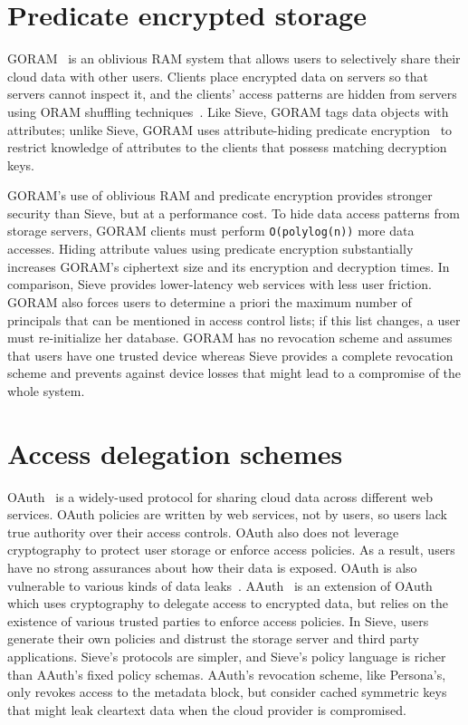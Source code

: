 \section{Predicate encrypted storage}
GORAM~\cite{GORAM} is an oblivious RAM system
that allows users to selectively share their
cloud data with other users. Clients place
encrypted data on servers so that servers cannot
inspect it, and the clients' access patterns are
hidden from servers using ORAM shuffling
techniques~\cite{shroud}. Like Sieve, GORAM tags
data objects with attributes; unlike Sieve,
GORAM uses attribute-hiding predicate encryption~\cite{katz2008,shen2009}
to restrict knowledge of attributes to the
clients that possess matching decryption keys.

GORAM's use of oblivious RAM and predicate
encryption provides stronger security than Sieve,
but at a performance cost. To hide
data access patterns from storage servers, GORAM
clients must perform \texttt{O(polylog(n))} more
data accesses. Hiding attribute values using
predicate encryption substantially increases 
GORAM's ciphertext size and its encryption
and decryption times. In comparison, Sieve
provides lower-latency web services with less
user friction. GORAM also forces users to
determine a priori the maximum number of
principals that can be mentioned in access
control lists; if this list changes, a user must
re-initialize her database. GORAM has no revocation
scheme and assumes that users have one trusted
device whereas Sieve provides a complete revocation
scheme and prevents against device losses
that might lead to a compromise of the whole
system.

\section{Access delegation schemes}


OAuth~\cite{oauth} is a widely-used protocol
for sharing cloud data across different web
services. OAuth policies are written by web
services, not by users, so users lack true
authority over their access controls. OAuth
also does not leverage cryptography to protect
user storage or enforce access policies. As a
result, users have no strong assurances about
how their data is exposed. OAuth is
also vulnerable to various kinds of data
leaks~\cite{oauthbugs, oauthbugs2}.
AAuth~\cite{aauth} is an extension of
OAuth which uses cryptography
to delegate access to encrypted data,
but relies on the existence
of various trusted parties to enforce
access policies. In Sieve, users
generate their own policies and distrust
the storage server and third party
applications. Sieve's protocols are 
simpler, and Sieve's policy
language is richer than AAuth's
fixed policy schemas. AAuth's revocation scheme,
like Persona's, only revokes access
to the metadata block, but consider
cached symmetric keys
that might leak cleartext data when
the cloud provider is compromised.


